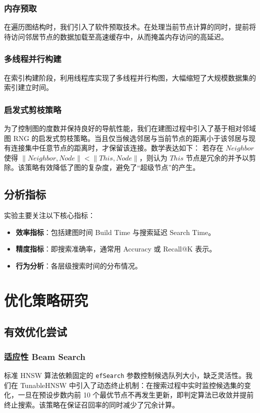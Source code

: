 \documentclass{article}
\begin{document}
\subsubsection{内存预取}
在遍历图结构时，我们引入了软件预取技术。在处理当前节点计算的同时，提前将待访问邻居节点的数据加载至高速缓存中，从而掩盖内存访问的高延迟。

\subsubsection{多线程并行构建}
在索引构建阶段，利用线程库实现了多线程并行构图，大幅缩短了大规模数据集的索引建立时间。

\subsubsection{启发式剪枝策略}
为了控制图的度数并保持良好的导航性能，我们在建图过程中引入了基于相对邻域图 RNG 的启发式剪枝策略。当且仅当候选邻居与当前节点的距离小于该邻居与现有连接集中任意节点的距离时，才保留该连接。数学表达如下：
若存在 $Neighbor$ 使得 $\lVert Neighbor, Node \rVert < \lVert This, Node \rVert$，则认为 $This$ 节点是冗余的并予以剪除。该策略有效降低了图的复杂度，避免了“超级节点”的产生。

\subsection{分析指标}
实验主要关注以下核心指标：
\begin{itemize}
    \item \textbf{效率指标}：包括建图时间 Build Time 与搜索延迟 Search Time。
    \item \textbf{精度指标}：即搜索准确率，通常用 Accuracy 或 Recall@K 表示。
    \item \textbf{行为分析}：各层级搜索时间的分布情况。
\end{itemize}

\section{优化策略研究}

\subsection{有效优化尝试}

\subsubsection{适应性 Beam Search}
标准 HNSW 算法依赖固定的 \texttt{efSearch} 参数控制候选队列大小，缺乏灵活性。我们在 TunableHNSW 中引入了动态终止机制：在搜索过程中实时监控候选集的变化，一旦在预设步数内前 10 个最优节点不再发生更新，即判定算法已收敛并提前终止搜索。该策略在保证召回率的同时减少了冗余计算。
\end{document}
